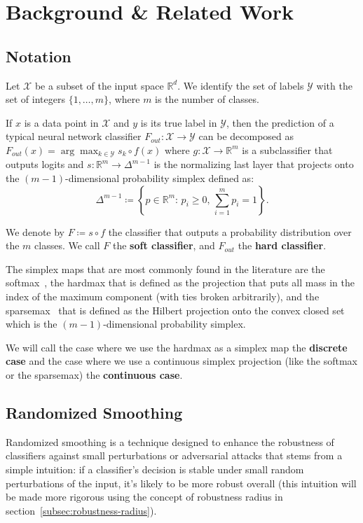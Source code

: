 \section{Background \& Related Work}\label{sec:background-&-related-work}

\subsection{Notation}\label{subsec:notation}
Let $\mathcal{X}$ be a subset of the input space $\mathbb{R}^d$.
We identify the set of labels $\mathcal{Y}$ with the set of integers $\{1, \ldots, m\}$, where $m$ is the number of classes.

If $x$ is a data point in $\mathcal{X}$ and $y$ is its true label in $\mathcal{Y}$, then the prediction of a typical neural network classifier $F_{out}: \mathcal{X} \rightarrow \mathcal{Y}$ can be decomposed as $F_{out}(x)=\arg\max_{k \in \mathcal{Y}}s_k\circ f(x)$ where $g: \mathcal{X} \rightarrow \mathbb{R}^m$ is a subclassifier that outputs logits
and $s: \mathbb{R}^m \rightarrow \Delta^{m-1}$ is the normalizing last layer that projects onto the $(m-1)$-dimensional probability simplex defined as:
\[
    \Delta^{m-1} \coloneqq \left\{p \in \mathbb{R}^m : \, p_i \geq 0, \,\sum_{i=1}^m p_i = 1 \right\}.
\]

We denote by $F\coloneqq s\circ f$ the classifier that outputs a probability distribution over the $m$ classes.
We call $F$ the \textbf{soft classifier}, and $F_{out}$ the \textbf{hard classifier}.

The simplex maps that are most commonly found in the literature are the softmax~\citep{bridle1989training}, the hardmax that is defined as the projection that puts all mass in the index of the maximum component (with ties broken arbitrarily), and the sparsemax~\citep{martins16} that is defined as the Hilbert projection onto the convex closed set which is the $(m-1)$-dimensional probability simplex.

We will call the case where we use the hardmax as a simplex map the \textbf{discrete case} and the case where we use a continuous simplex projection (like the softmax or the sparsemax) the \textbf{continuous case}.

\subsection{Randomized Smoothing}\label{subsec:randomized-smoothing}
Randomized smoothing is a technique designed to enhance the robustness of classifiers against small perturbations or adversarial attacks that stems from a simple intuition: if a classifier's decision is stable under small random perturbations of the input, it's likely to be more robust overall (this intuition will be made more rigorous using the concept of robustness radius in section~\ref{subsec:robustness-radius}).

